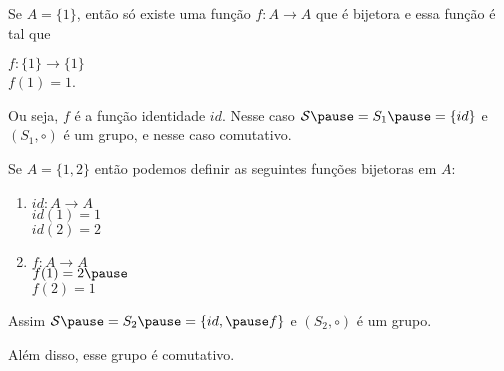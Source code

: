 \documentclass{beamer}
\begin{document}
    \begin{frame}
        Se $A = \{1\}$, \pause então s\'o existe uma função $f : A \to A$ \pause que é bijetora e essa função é tal que \pause
        \begin{center}
            $f : \{1\} \to \{1\}$ \pause\\
            $f(1) = 1$. \pause
        \end{center}
        Ou seja, $f$ é a função identidade $id$. \pause Nesse caso $\mathcal{S} \pause = S_1 \pause = \{id\}$ \pause e $(S_1, \circ)$ é um grupo, \pause e nesse caso comutativo. \pause
    \end{frame}

    \begin{frame}
        Se $A = \{1, 2\}$ \pause então podemos definir as seguintes funções bijetoras em $A$: \pause
        \begin{multicols}{2}
            \begin{enumerate}
                \item[] \begin{center}
                    $id : A \to A$ \pause\\
                    $id(1) = 1$ \pause\\ $id(2) = 2$
                \end{center}\pause
                \item[]  \begin{center}
                    $f : A \to A$ \pause\\ $f(1) = 2 \pause$\\ $f(2) = 1$
                \end{center}\pause
            \end{enumerate}
        \end{multicols}

        Assim $\mathcal{S} \pause = S_2 \pause = \{id, \pause f\}$ \pause e $(S_2, \circ)$ é um grupo.\pause

        Além disso, esse grupo é comutativo.
    \end{frame}
\end{document}
